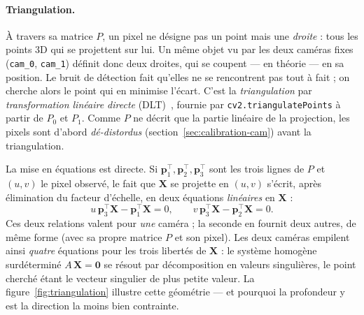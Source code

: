 \paragraph{Triangulation.} À travers sa matrice $P$, un pixel ne désigne pas un point mais une \emph{droite} : tous les points 3D qui se projettent sur lui. Un même objet vu par les deux caméras fixes (\texttt{cam\_0}, \texttt{cam\_1}) définit donc deux droites, qui se coupent --- en théorie --- en sa position. Le bruit de détection fait qu'elles ne se rencontrent pas tout à fait ; on cherche alors le point qui en minimise l'écart. C'est la \emph{triangulation} par \emph{transformation linéaire directe} (DLT)~\cite{hartley_multiple_2018}, fournie par \texttt{cv2.triangulatePoints} à partir de $P_0$ et $P_1$. Comme $P$ ne décrit que la partie linéaire de la projection, les pixels sont d'abord \emph{dé-distordus} (section~\ref{sec:calibration-cam}) avant la triangulation.

La mise en équations est directe. Si $\mathbf{p}_1^{\top}, \mathbf{p}_2^{\top}, \mathbf{p}_3^{\top}$ sont les trois lignes de $P$ et $(u, v)$ le pixel observé, le fait que $\mathbf{X}$ se projette en $(u,v)$ s'écrit, après élimination du facteur d'échelle, en deux équations \emph{linéaires} en $\mathbf{X}$ :
\[
  u\,\mathbf{p}_3^{\top}\mathbf{X} - \mathbf{p}_1^{\top}\mathbf{X} = 0 , \qquad
  v\,\mathbf{p}_3^{\top}\mathbf{X} - \mathbf{p}_2^{\top}\mathbf{X} = 0 .
\]
Ces deux relations valent pour \emph{une} caméra ; la seconde en fournit deux autres, de même forme (avec sa propre matrice $P$ et son pixel). Les deux caméras empilent ainsi \emph{quatre} équations pour les trois libertés de $\mathbf{X}$ : le système homogène surdéterminé $A\,\mathbf{X} = \mathbf{0}$ se résout par décomposition en valeurs singulières, le point cherché étant le vecteur singulier de plus petite valeur. La figure~\ref{fig:triangulation} illustre cette géométrie --- et pourquoi la profondeur y est la direction la moins bien contrainte.

